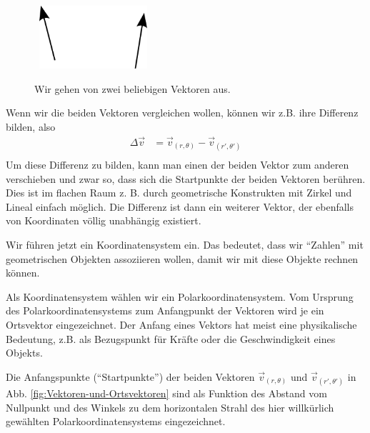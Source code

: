 \begin{figure}
  \centering
  \mbox{
    \includegraphics[width=4cm]{img/Christoffel-Zeichnung-1.png}
  }
    \captionsetup{singlelinecheck=off}
    \caption[.]{Wir gehen von zwei beliebigen Vektoren aus.
	}
    \label{fig:Vektoren-ohne-alles}
\end{figure}

Wenn wir die beiden Vektoren vergleichen wollen, können wir z.B. ihre Differenz bilden, also
\begin{align*}
	\Delta \overrightarrow{v} &=   \overrightarrow{v}_{(r,\theta)} - \overrightarrow{v}_{(r',\theta')}\\
\end{align*} 
Um diese Differenz zu bilden, kann man einen der beiden Vektor zum anderen verschieben und zwar so, dass sich die Startpunkte der beiden Vektoren berühren. Dies ist im flachen Raum z. B. durch geometrische Konstrukten mit Zirkel und Lineal einfach möglich. Die Differenz ist dann ein weiterer Vektor, der ebenfalls von Koordinaten völlig unabhängig existiert.

Wir führen jetzt ein Koordinatensystem ein. Das bedeutet, dass wir "`Zahlen"' mit geometrischen Objekten assoziieren wollen, damit wir mit diese Objekte rechnen können.

Als Koordinatensystem wählen wir ein Polarkoordinatensystem. Vom Ursprung des Polarkoordinatensystems zum Anfangpunkt der Vektoren wird je ein Ortsvektor eingezeichnet. Der Anfang eines Vektors hat meist eine physikalische Bedeutung, z.B. als Bezugspunkt für Kräfte oder die Geschwindigkeit eines Objekts. 

Die Anfangspunkte ("`Startpunkte"') der beiden Vektoren $ \overrightarrow{v}_{(r,\theta)} $ und $ \overrightarrow{v}_{(r',\theta')} $ in  Abb. \ref{fig:Vektoren-und-Ortsvektoren} sind als Funktion des Abstand vom Nullpunkt und des Winkels zu dem horizontalen Strahl des hier willkürlich gewählten Polarkoordinatensystems eingezeichnet.


